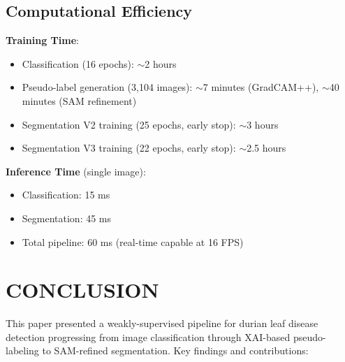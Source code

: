 \documentclass[10pt,a4paper]{article}
\begin{document}
\subsection{Computational Efficiency}

\textbf{Training Time}:
\begin{itemize}
\item Classification (16 epochs): $\sim$2 hours
\item Pseudo-label generation (3,104 images): $\sim$7 minutes (GradCAM++), $\sim$40 minutes (SAM refinement)
\item Segmentation V2 training (25 epochs, early stop): $\sim$3 hours
\item Segmentation V3 training (22 epochs, early stop): $\sim$2.5 hours
\end{itemize}

\textbf{Inference Time} (single image):
\begin{itemize}
\item Classification: 15 ms
\item Segmentation: 45 ms
\item Total pipeline: 60 ms (real-time capable at 16 FPS)
\end{itemize}

\section{CONCLUSION}

This paper presented a weakly-supervised pipeline for durian leaf disease detection progressing from image classification through XAI-based pseudo-labeling to SAM-refined segmentation. Key findings and contributions:
\end{document}
